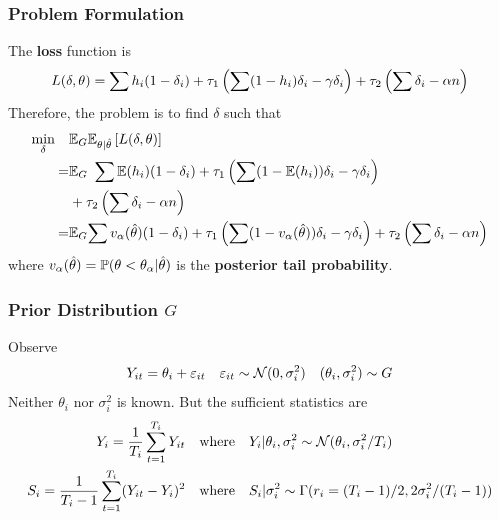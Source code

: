 \documentclass[10pt,mathserif,aspectratio=169]{beamer}
\begin{document}
\begin{frame}
  \frametitle{Problem Formulation}
  The \textbf{loss} function is
  \begin{equation*}
    L(\delta,\theta)=\sum h_i(1-\delta_i) +\tau_1\left(\sum (1-h_i)\delta_i -\gamma \delta_i\right) + \tau_2 \left(\sum \delta_i -\alpha n\right)
  \end{equation*}
  Therefore, the problem is to find $\delta$ such that
  \begin{align*}
    \min_{\delta} \quad & \mathbb{E}_G\mathbb{E}_{\theta|\hat{\theta}}\left[L(\delta,\theta)\right]                                                                                                       \\
    =                   & \mathbb{E}_G \ \sum \mathbb{E}(h_i)(1-\delta_i) +\tau_1\left(\sum (1-\mathbb{E}(h_i))\delta_i -\gamma \delta_i\right)                                                                    \\
                        & + \tau_2 \left(\sum \delta_i -\alpha n\right)                                                                                                                    \\
    =                   & \mathbb{E}_G{\sum v_\alpha(\hat{\theta})(1-\delta_i) +\tau_1\left(\sum (1-v_\alpha(\hat{\theta}))\delta_i -\gamma \delta_i\right) + \tau_2 \left(\sum \delta_i -\alpha n\right)}
  \end{align*} where $v_\alpha(\hat{\theta})=\mathbb{P}(\theta<\theta_\alpha|\hat{\theta})$ is the \textbf{posterior tail probability}.
\end{frame}

\begin{frame}
  \frametitle{Prior Distribution $G$}
  Observe
  \begin{equation*}
    Y_{it} = \theta_i + \varepsilon_{it} \quad \varepsilon_{it} \sim \mathcal{N}(0,\sigma_i^2) \quad (\theta_i,\sigma_i^2) \sim G
  \end{equation*}
  Neither $\theta_i$ nor $\sigma_i^2$ is known. But the sufficient statistics are
  \begin{align*}
    Y_i=\frac{1}{T_i}\sum_{t=1}^{T_i}Y_{it}           & \quad \text{where}\quad Y_i|\theta_i,\sigma_i^2 \sim \mathcal{N}(\theta_i,\sigma_i^2/T_i)     \\
    S_i=\frac{1}{T_i-1}\sum_{t=1}^{T_i}(Y_{it}-Y_i)^2 & \quad \text{where} \quad S_i|\sigma_i^2 \sim \Gamma(r_i= (T_i-1)/2,2\sigma_i^2/(T_i-1)) \\
  \end{align*}
\end{frame}
\end{document}
